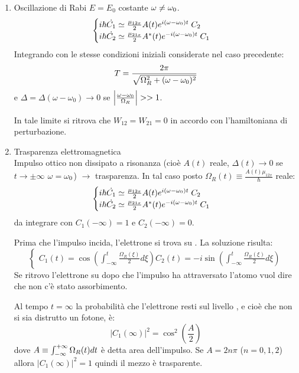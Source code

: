 \begin{enumerate}
    \item  Oscillazione di Rabi $E = E_0$ costante $\omega \neq \omega_0$.
    \begin{equation}
        \begin{cases}
            i\hbar \dot{C_1} \simeq  \frac{\mu_{12x}}{2}A(t) e^{i (\omega-\omega_0) t} \; C_2\\
            i\hbar \dot{C_2} \simeq  \frac{\mu_{21x}}{2} A^*(t)e^{-i (\omega-\omega_0) t} \; C_1
        \end{cases}
    \end{equation}
    Integrando con le stesse condizioni iniziali considerate nel caso precedente:
    \begin{equation}
        T = \frac{2\pi}{\sqrt{\Omega_R^2 + (\omega - \omega_0)^2}}
    \end{equation}
    e $\Delta = \Delta(\omega - \omega_0) \to 0$ se $\left|\frac{\omega - \omega_0}{\Omega_R}\right| >> 1$.
    
    In tale limite si ritrova che $W_{12} = W_{21} = 0$ in accordo con l'hamiltoniana di perturbazione.
    
    \item Trasparenza elettromagnetica\\
    Impulso ottico non dissipato a risonanza (cioè $A(t)$ reale, $\Delta(t) \to 0$ se $t \to \pm \infty$ $\omega=\omega_0$) $\rightarrow$ trasparenza.
    In tal caso posto $\Omega_R(t) \equiv \frac{A(t) \mu_{12x}}{\hbar}$ reale:
    \begin{equation}
        \begin{cases}
            i\hbar \dot{C_1} \simeq  \frac{\mu_{12x}}{2}A(t) e^{i (\omega-\omega_0) t} \; C_2\\
            i\hbar \dot{C_2} \simeq  \frac{\mu_{21x}}{2} A^*(t)e^{-i (\omega-\omega_0) t} \; C_1
        \end{cases}
    \end{equation}
    da integrare con $C_1(-\infty) = 1$ e $C_2(-\infty) = 0$.
    
    Prima che l'impulso incida, l'elettrone si trova su .
    La soluzione risulta:
    \begin{equation}
        \begin{cases}
            C_1(t) = \cos\left(\int_{-\infty}^t \frac{\Omega_R(\xi)}{2} d\xi\right)
            C_2(t) = -i \sin\left(\int_{-\infty}^t \frac{\Omega_R(\xi)}{2} d\xi \right)
        \end{cases}
    \end{equation}
    Se ritrovo l'elettrone su  dopo che l'impulso ha attraversato l'atomo vuol dire che non c'è stato assorbimento.
    
    Al tempo $t = \infty$ la probabilità che l'elettrone resti sul livello , e cioè che non si sia distrutto un fotone, è:
    \begin{equation}
        |C_1(\infty)|^2 = \cos^2\left(\frac{A}{2}\right)
    \end{equation}
    dove $A \equiv \int_{-\infty}^{+\infty} \Omega_R(t) dt$ è detta area dell'impulso.
    Se $A=2n\pi$ ($n = 0,1,2$) allora $|C_1(\infty)|^2 = 1$ quindi il mezzo è trasparente.
\end{enumerate}


